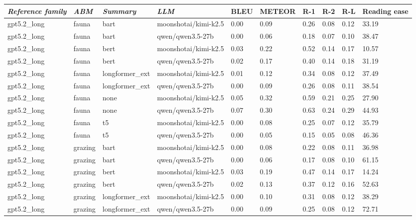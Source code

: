 \begin{tabular}{|l|l|l|l|l|l|l|l|l|l|}
\hline
\textit{\textbf{Reference family}} & \textit{\textbf{ABM}} & \textit{\textbf{Summary}} & \textit{\textbf{LLM}} & BLEU & METEOR & R-1 & R-2 & R-L & Reading ease \\
 \hline
 gpt5.2\_long & fauna & bart & moonshotai/kimi-k2.5 & 0.00 & 0.09 & 0.26 & 0.08 & 0.12 & 33.19 \\
 \hline
 gpt5.2\_long & fauna & bart & qwen/qwen3.5-27b & 0.00 & 0.06 & 0.18 & 0.07 & 0.10 & 38.47 \\
 \hline
 gpt5.2\_long & fauna & bert & moonshotai/kimi-k2.5 & 0.03 & 0.22 & 0.52 & 0.14 & 0.17 & 10.57 \\
 \hline
 gpt5.2\_long & fauna & bert & qwen/qwen3.5-27b & 0.02 & 0.17 & 0.40 & 0.14 & 0.18 & 31.19 \\
 \hline
 gpt5.2\_long & fauna & longformer\_ext & moonshotai/kimi-k2.5 & 0.01 & 0.12 & 0.34 & 0.08 & 0.12 & 37.49 \\
 \hline
 gpt5.2\_long & fauna & longformer\_ext & qwen/qwen3.5-27b & 0.00 & 0.09 & 0.26 & 0.08 & 0.11 & 38.54 \\
 \hline
 gpt5.2\_long & fauna & none & moonshotai/kimi-k2.5 & 0.05 & 0.32 & 0.59 & 0.21 & 0.25 & 27.90 \\
 \hline
 gpt5.2\_long & fauna & none & qwen/qwen3.5-27b & 0.07 & 0.30 & 0.63 & 0.24 & 0.29 & 44.93 \\
 \hline
 gpt5.2\_long & fauna & t5 & moonshotai/kimi-k2.5 & 0.00 & 0.08 & 0.25 & 0.07 & 0.12 & 35.79 \\
 \hline
 gpt5.2\_long & fauna & t5 & qwen/qwen3.5-27b & 0.00 & 0.05 & 0.15 & 0.05 & 0.08 & 46.36 \\
 \hline
 gpt5.2\_long & grazing & bart & moonshotai/kimi-k2.5 & 0.00 & 0.08 & 0.22 & 0.08 & 0.11 & 36.98 \\
 \hline
 gpt5.2\_long & grazing & bart & qwen/qwen3.5-27b & 0.00 & 0.06 & 0.17 & 0.08 & 0.10 & 61.15 \\
 \hline
 gpt5.2\_long & grazing & bert & moonshotai/kimi-k2.5 & 0.03 & 0.19 & 0.47 & 0.14 & 0.17 & 14.24 \\
 \hline
 gpt5.2\_long & grazing & bert & qwen/qwen3.5-27b & 0.02 & 0.13 & 0.37 & 0.12 & 0.16 & 52.63 \\
 \hline
 gpt5.2\_long & grazing & longformer\_ext & moonshotai/kimi-k2.5 & 0.00 & 0.10 & 0.31 & 0.08 & 0.12 & 38.29 \\
 \hline
 gpt5.2\_long & grazing & longformer\_ext & qwen/qwen3.5-27b & 0.00 & 0.09 & 0.25 & 0.08 & 0.12 & 72.71 \\

\end{tabular}
